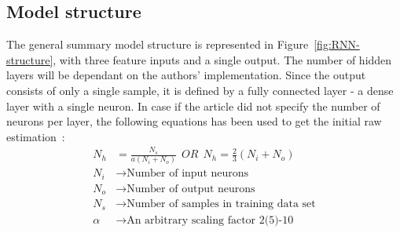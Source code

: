 \subsection{Model structure} \label{subsec:structure}
The general summary model structure is represented in Figure~\ref{fig:RNN-structure}, with three feature inputs and a single output.
The number of hidden layers will be dependant on the authors' implementation.
Since the output consists of only a single sample, it is defined by a fully connected layer - a dense layer with a single neuron.
In case if the article did not specify the number of neurons per layer, the following equations has been used to get the initial raw estimation~\cite{eckhardt_choosing_2018}:
\begin{equation}
    \begin{split}
        N_h &= \frac{N_s}{ a \left(N_i+N_o \right)} \ \ OR \ \ N_h = \frac{2}{3}\left(N_i+N_o \right) \\
        N_i &\rightarrow \text{Number of input neurons} \\
        N_o &\rightarrow \text{Number of output neurons} \\
        N_s &\rightarrow \text{Number of samples in training data set} \\
        \alpha &\rightarrow \text{An arbitrary scaling factor 2(5)-10}
    \end{split}
\end{equation}


